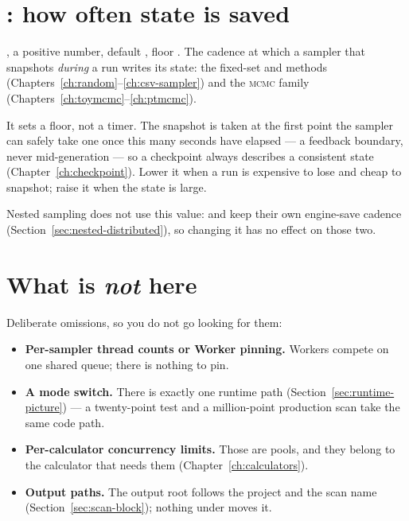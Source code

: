 \section{: how often state is saved}
\label{sec:checkpoint-heartbeat}

\opt, a positive number, default , floor . The cadence at which a
sampler that snapshots \emph{during} a run writes its state: the fixed-set and
 methods (Chapters~\ref{ch:random}--\ref{ch:csv-sampler}) and the
\textsc{mcmc} family (Chapters~\ref{ch:toymcmc}--\ref{ch:ptmcmc}).

It sets a floor, not a timer. The snapshot is taken at the first point the sampler can
safely take one once this many seconds have elapsed --- a feedback boundary, never
mid-generation --- so a checkpoint always describes a consistent state
(Chapter~\ref{ch:checkpoint}). Lower it when a run is expensive to lose and cheap to
snapshot; raise it when the state is large.

Nested sampling does not use this value:  and  keep
their own engine-save cadence (Section~\ref{sec:nested-distributed}), so changing it has
no effect on those two.

\section{What is \emph{not} here}
\label{sec:not-here}

Deliberate omissions, so you do not go looking for them:

\begin{itemize}
  \item \textbf{Per-sampler thread counts or Worker pinning.} Workers compete on one
        shared queue; there is nothing to pin.
  \item \textbf{A mode switch.} There is exactly one runtime path
        (Section~\ref{sec:runtime-picture}) --- a twenty-point test and a million-point
        production scan take the same code path.
  \item \textbf{Per-calculator concurrency limits.} Those are pools, and they belong to
        the calculator that needs them (Chapter~\ref{ch:calculators}).
  \item \textbf{Output paths.} The output root follows the project and the scan name
        (Section~\ref{sec:scan-block}); nothing under  moves it.
\end{itemize}
